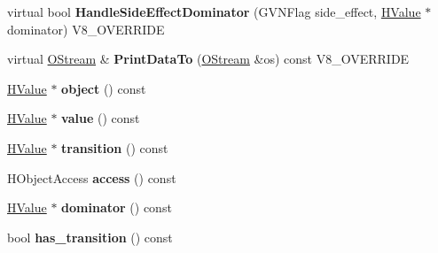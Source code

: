 \begin{DoxyCompactItemize}
\item 
\hypertarget{classv8_1_1internal_1_1_v8___f_i_n_a_l_a05c41b70d08a5a1706e2c0520deebb01}{}virtual bool {\bfseries Handle\+Side\+Effect\+Dominator} (G\+V\+N\+Flag side\+\_\+effect, \hyperlink{classv8_1_1internal_1_1_h_value}{H\+Value} $\ast$dominator) V8\+\_\+\+O\+V\+E\+R\+R\+I\+D\+E\label{classv8_1_1internal_1_1_v8___f_i_n_a_l_a05c41b70d08a5a1706e2c0520deebb01}

\item 
\hypertarget{classv8_1_1internal_1_1_v8___f_i_n_a_l_ac450dad970b14246be761ccf5004924b}{}virtual \hyperlink{classv8_1_1internal_1_1_o_stream}{O\+Stream} \& {\bfseries Print\+Data\+To} (\hyperlink{classv8_1_1internal_1_1_o_stream}{O\+Stream} \&os) const V8\+\_\+\+O\+V\+E\+R\+R\+I\+D\+E\label{classv8_1_1internal_1_1_v8___f_i_n_a_l_ac450dad970b14246be761ccf5004924b}

\item 
\hypertarget{classv8_1_1internal_1_1_v8___f_i_n_a_l_a5cf72ed4b954f3413a0aa63069a75283}{}\hyperlink{classv8_1_1internal_1_1_h_value}{H\+Value} $\ast$ {\bfseries object} () const \label{classv8_1_1internal_1_1_v8___f_i_n_a_l_a5cf72ed4b954f3413a0aa63069a75283}

\item 
\hypertarget{classv8_1_1internal_1_1_v8___f_i_n_a_l_a998b3feae0e84bbe080297551603911f}{}\hyperlink{classv8_1_1internal_1_1_h_value}{H\+Value} $\ast$ {\bfseries value} () const \label{classv8_1_1internal_1_1_v8___f_i_n_a_l_a998b3feae0e84bbe080297551603911f}

\item 
\hypertarget{classv8_1_1internal_1_1_v8___f_i_n_a_l_a632c72f61310060ca6f75248d4ff45ef}{}\hyperlink{classv8_1_1internal_1_1_h_value}{H\+Value} $\ast$ {\bfseries transition} () const \label{classv8_1_1internal_1_1_v8___f_i_n_a_l_a632c72f61310060ca6f75248d4ff45ef}

\item 
\hypertarget{classv8_1_1internal_1_1_v8___f_i_n_a_l_ab03dc0adb68e3ab7f30fc3362803f523}{}H\+Object\+Access {\bfseries access} () const \label{classv8_1_1internal_1_1_v8___f_i_n_a_l_ab03dc0adb68e3ab7f30fc3362803f523}

\item 
\hypertarget{classv8_1_1internal_1_1_v8___f_i_n_a_l_a0770c13d5d2d630501a260cac0e892be}{}\hyperlink{classv8_1_1internal_1_1_h_value}{H\+Value} $\ast$ {\bfseries dominator} () const \label{classv8_1_1internal_1_1_v8___f_i_n_a_l_a0770c13d5d2d630501a260cac0e892be}

\item 
\hypertarget{classv8_1_1internal_1_1_v8___f_i_n_a_l_abb02d14f330af0b1dc17b4876137fe47}{}bool {\bfseries has\+\_\+transition} () const \label{classv8_1_1internal_1_1_v8___f_i_n_a_l_abb02d14f330af0b1dc17b4876137fe47}


\end{DoxyCompactItemize}
